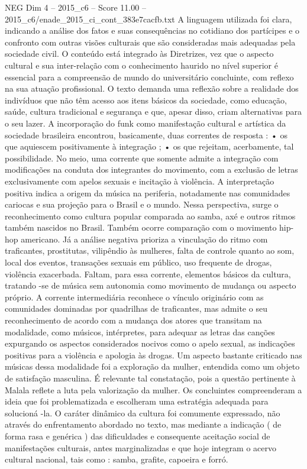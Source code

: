 \begin{textsample}{NEG Dim 4 – 2015\_c6 – Score 11.00 – 2015\_c6/enade\_2015\_ci\_cont\_383e7cacfb.txt}
A linguagem utilizada foi clara, indicando a análise dos fatos e suas consequências no cotidiano dos partícipes e o confronto com outras visões culturais que são consideradas mais adequadas pela sociedade civil.
O conteúdo está integrado às Diretrizes, vez que o aspecto cultural e sua inter-relação com o conhecimento haurido no nível superior é essencial para a compreensão de mundo do universitário concluinte, com reflexo na sua atuação profissional.
O texto demanda uma reflexão sobre a realidade dos indivíduos que não têm acesso aos itens básicos da sociedade, como educação, saúde, cultura tradicional e segurança e que, apesar disso, criam alternativas para o seu lazer.
A incorporação do funk como manifestação cultural e artística da sociedade brasileira encontrou, basicamente, duas correntes de resposta : • os que aquiescem positivamente à integração ; • os que rejeitam, acerbamente, tal possibilidade.
No meio, uma corrente que somente admite a integração com modificações na conduta dos integrantes do movimento, com a exclusão de letras exclusivamente com apelos sexuais e incitação à violência.
A interpretação positiva indica a origem da música na periferia, notadamente nas comunidades cariocas e sua projeção para o Brasil e o mundo.
Nessa perspectiva, surge o reconhecimento como cultura popular comparada ao samba, axé e outros ritmos também nascidos no Brasil.
Também ocorre comparação com o movimento hip-hop americano.
Já a análise negativa prioriza a vinculação do ritmo com traficantes, prostitutas, vilipêndio às mulheres, falta de controle quanto ao som, local dos eventos, transações sexuais em público, uso frequente de drogas, violência exacerbada.
Faltam, para essa corrente, elementos básicos da cultura, tratando -se de música sem autonomia como movimento de mudança ou aspecto próprio.
A corrente intermediária reconhece o vínculo originário com as comunidades dominadas por quadrilhas de traficantes, mas admite o seu reconhecimento de acordo com a mudança dos atores que transitam na modalidade, como músicos, intérpretes, para adequar as letras das canções expurgando os aspectos considerados nocivos como o apelo sexual, as indicações positivas para a violência e apologia às drogas.
Um aspecto bastante criticado nas músicas dessa modalidade foi a exploração da mulher, entendida como um objeto de satisfação masculina.
É relevante tal constatação, pois a questão pertinente à Malala reflete a luta pela valorização da mulher.
Os concluintes compreenderam a ideia que foi problematizada e escolheram uma estratégia adequada para solucioná -la.
O caráter dinâmico da cultura foi comumente expressado, não através do enfrentamento abordado no texto, mas mediante a indicação ( de forma rasa e genérica ) das dificuldades e consequente aceitação social de manifestações culturais, antes marginalizadas e que hoje integram o acervo cultural nacional, tais como : samba, grafite, capoeira e forró.

\end{textsample}
